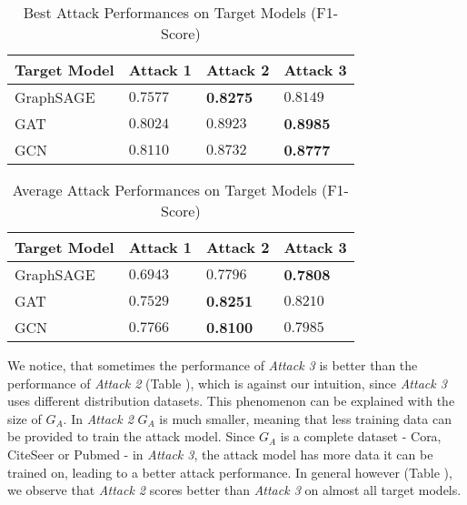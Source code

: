         \vspace{0.48cm}
        \begin{table}[!h]
            \centering
            \footnotesize
            \begin{tabular}{l|l|l|l|}
                \toprule
                Target Model & Attack 1 & Attack 2 & Attack 3 \\
                \midrule
                GraphSAGE & $0.7577$ & \textbf{0.8275} & $0.8149$ \\
                GAT & $0.8024$ & $0.8923$ & \textbf{0.8985} \\
                GCN & $0.8110$ & $0.8732$ & \textbf{0.8777} \\
                
                \bottomrule
            \end{tabular}
            \caption{Best Attack Performances on Target Models (F1-Score)}
            \label{table:attack-best-results-all}
          \end{table}
        
        \vspace{0.48cm}
        \begin{table}[!h]
            \centering
            \footnotesize
            \begin{tabular}{l|l|l|l|}
                \toprule
                Target Model & Attack 1 & Attack 2 & Attack 3 \\
                \midrule
                GraphSAGE & $0.6943$ & $0.7796$ & \textbf{0.7808} \\
                GAT & $0.7529$ & \textbf{0.8251} & $0.8210$ \\
                GCN & $0.7766$ & \textbf{0.8100} & $0.7985$ \\
                
                \bottomrule
            \end{tabular}
            \caption{Average Attack Performances on Target Models (F1-Score)}
            \label{table:attack-avg-results-all}
        \end{table}
    
    We notice, that sometimes the performance of \emph{Attack 3} is better than the performance of \emph{Attack 2} (Table ), which is against our intuition, since \emph{Attack 3} uses different distribution datasets.
    This phenomenon can be explained with the size of $G_A$.
    In \emph{Attack 2} $G_A$ is much smaller, meaning that less training data can be provided to train the attack model.
    Since $G_A$ is a complete dataset - Cora, CiteSeer or Pubmed - in \emph{Attack 3}, the attack model has more data it can be trained on, leading to a better attack performance.
    In general however (Table ), we observe that \emph{Attack 2} scores better than \emph{Attack 3} on almost all target models.

